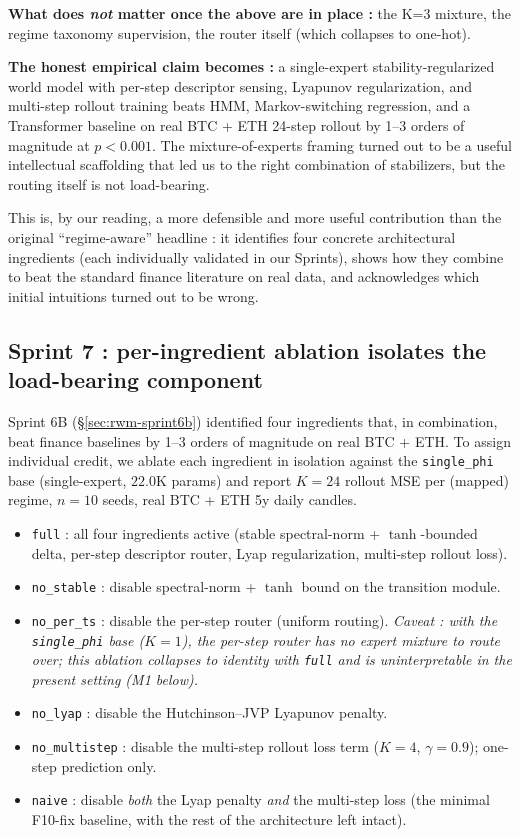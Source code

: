\documentclass[11pt,a4paper]{article}
\begin{document}
\textbf{What does \emph{not} matter once the above are in place :}
the K=3 mixture, the regime taxonomy supervision, the router itself
(which collapses to one-hot).

\textbf{The honest empirical claim becomes :} a single-expert
stability-regularized world model with per-step descriptor sensing,
Lyapunov regularization, and multi-step rollout training beats HMM,
Markov-switching regression, and a Transformer baseline on real BTC
+ ETH 24-step rollout by 1--3 orders of magnitude at $p{<}0.001$.
The mixture-of-experts framing turned out to be a useful
intellectual scaffolding that led us to the right combination of
stabilizers, but the routing itself is not load-bearing.

This is, by our reading, a more defensible and more useful
contribution than the original ``regime-aware'' headline : it
identifies four concrete architectural ingredients (each
individually validated in our Sprints), shows how they combine to
beat the standard finance literature on real data, and acknowledges
which initial intuitions turned out to be wrong.

\subsection{Sprint 7 : per-ingredient ablation isolates the load-bearing component}
\label{sec:rwm-sprint7}

Sprint 6B (\S\ref{sec:rwm-sprint6b}) identified four ingredients
that, in combination, beat finance baselines by 1--3 orders of
magnitude on real BTC + ETH. To assign individual credit, we
ablate each ingredient in isolation against the
\texttt{single\_phi} base (single-expert, $22.0$K params) and
report $K{=}24$ rollout MSE per (mapped) regime, $n{=}10$ seeds,
real BTC + ETH 5y daily candles.

\begin{itemize}[leftmargin=*]
\item \texttt{full} : all four ingredients active (stable
  spectral-norm + $\tanh$-bounded delta, per-step descriptor
  router, Lyap regularization, multi-step rollout loss).
\item \texttt{no\_stable} : disable spectral-norm + $\tanh$ bound
  on the transition module.
\item \texttt{no\_per\_ts} : disable the per-step router (uniform
  routing). \emph{Caveat : with the \texttt{single\_phi} base
  ($K{=}1$), the per-step router has no expert mixture to route
  over; this ablation collapses to identity with \texttt{full}
  and is uninterpretable in the present setting (M1 below).}
\item \texttt{no\_lyap} : disable the Hutchinson--JVP Lyapunov
  penalty.
\item \texttt{no\_multistep} : disable the multi-step rollout
  loss term ($K{=}4$, $\gamma{=}0.9$); one-step prediction only.
\item \texttt{naive} : disable \emph{both} the Lyap penalty
  \emph{and} the multi-step loss (the minimal F10-fix baseline,
  with the rest of the architecture left intact).
\end{itemize}
\end{document}

